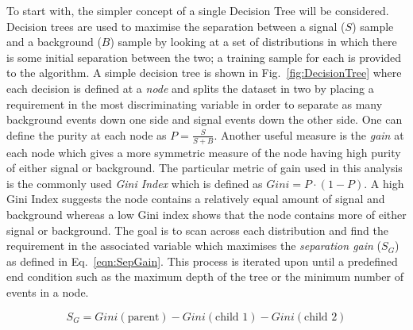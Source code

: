 To start with, the simpler concept of a single Decision Tree will be considered. Decision trees are used to maximise the separation between a signal ($S$) sample and a background ($B$) sample by looking at a set of distributions in which there is some initial separation between the two; a training sample for each is provided to the algorithm. A simple decision tree is shown in Fig.~\ref{fig:DecisionTree} where each decision is defined at a \emph{node} and splits the dataset in two by placing a requirement in the most discriminating variable in order to separate as many background events down one side and signal events down the other side.
One can define the purity at each node as $P=\frac{S}{S+B}$. Another useful measure is the \emph{gain} at each node which gives a more symmetric measure of the node having high purity of either signal or background. The particular metric of gain used in this analysis is the commonly used \emph{Gini Index} which is defined as $Gini = P\cdot\left(1-P\right)$. A high Gini Index suggests the node contains a relatively equal amount of signal and background whereas a low Gini index shows that the node contains more of either signal or background. 
The goal is to scan across each distribution and find the requirement in the associated variable which maximises the \emph{separation gain} ($S_{G}$) as defined in Eq.~\ref{eqn:SepGain}. This process is iterated upon until a predefined end condition such as the maximum depth of the tree or the minimum number of events in a node.




\begin{equation}
S_{G} = Gini(\textrm{parent}) - Gini(\textrm{child 1}) - Gini(\textrm{child 2})
\label{eqn:SepGain}
\end{equation}

